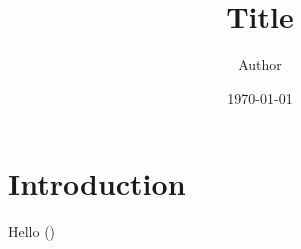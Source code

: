 \documentclass[12pt]{article}
\begin{document}
\title{Title}
\author{Author}
\date{\today}
\maketitle

\section{Introduction}
Hello ()
\end{document}
